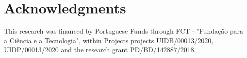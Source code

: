 
\section*{Acknowledgments}
This research was financed by Portuguese Funds through FCT - "Funda\c{c}\~{a}o para a Ci\^{e}ncia e a Tecnologia", within Projects projects UIDB/00013/2020, UIDP/00013/2020 and the research grant PD/BD/142887/2018.\\




\address{Gustavo Soutinho\\
  EPIUnit, Institute of Public Health of the University of Porto (ISPUP)\\
  Rua das Taipas 135, 4050-600 Porto\\
  Portugal\\
  ORCID: 0000-0002-0559-1327\\
  }

\address{Lu\'{i}s Meira-Machado\\
  Department of Mathematics \& Centre of Mathematics, University of Minho\\
  Campus de Azur\'{e}m - 4800-058 Guimar\~{a}es\\
  Portugal\\
  ORCID: 0000-0002-8577-7665\\
  }

